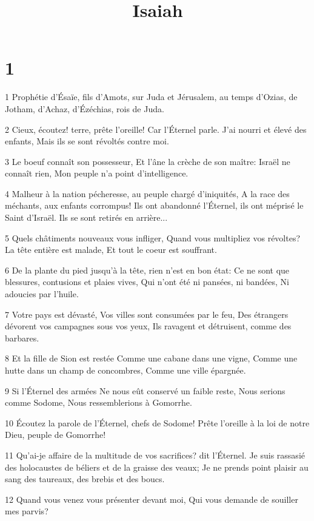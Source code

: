 

\title{Isaiah}


\chapter{1}

\par 1 Prophétie d'Ésaïe, fils d'Amots, sur Juda et Jérusalem, au temps d'Ozias, de Jotham, d'Achaz, d'Ézéchias, rois de Juda.
\par 2 Cieux, écoutez! terre, prête l'oreille! Car l'Éternel parle. J'ai nourri et élevé des enfants, Mais ils se sont révoltés contre moi.
\par 3 Le boeuf connaît son possesseur, Et l'âne la crèche de son maître: Israël ne connaît rien, Mon peuple n'a point d'intelligence.
\par 4 Malheur à la nation pécheresse, au peuple chargé d'iniquités, A la race des méchants, aux enfants corrompus! Ils ont abandonné l'Éternel, ils ont méprisé le Saint d'Israël. Ils se sont retirés en arrière...
\par 5 Quels châtiments nouveaux vous infliger, Quand vous multipliez vos révoltes? La tête entière est malade, Et tout le coeur est souffrant.
\par 6 De la plante du pied jusqu'à la tête, rien n'est en bon état: Ce ne sont que blessures, contusions et plaies vives, Qui n'ont été ni pansées, ni bandées, Ni adoucies par l'huile.
\par 7 Votre pays est dévasté, Vos villes sont consumées par le feu, Des étrangers dévorent vos campagnes sous vos yeux, Ils ravagent et détruisent, comme des barbares.
\par 8 Et la fille de Sion est restée Comme une cabane dans une vigne, Comme une hutte dans un champ de concombres, Comme une ville épargnée.
\par 9 Si l'Éternel des armées Ne nous eût conservé un faible reste, Nous serions comme Sodome, Nous ressemblerions à Gomorrhe.
\par 10 Écoutez la parole de l'Éternel, chefs de Sodome! Prête l'oreille à la loi de notre Dieu, peuple de Gomorrhe!
\par 11 Qu'ai-je affaire de la multitude de vos sacrifices? dit l'Éternel. Je suis rassasié des holocaustes de béliers et de la graisse des veaux; Je ne prends point plaisir au sang des taureaux, des brebis et des boucs.
\par 12 Quand vous venez vous présenter devant moi, Qui vous demande de souiller mes parvis?
